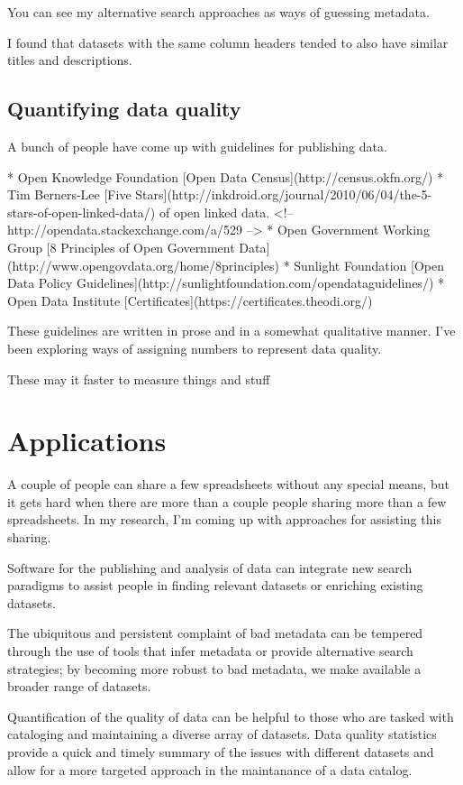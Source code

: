 \documentclass{acm_proc_article-sp}
\begin{document}
You can see my alternative search approaches as ways of guessing metadata.

I found that datasets with the same column headers
tended to also have similar titles and descriptions.


\subsection{Quantifying data quality}
A bunch of people have come up with guidelines for publishing data.

* Open Knowledge Foundation [Open Data Census](http://census.okfn.org/)
* Tim Berners-Lee [Five Stars](http://inkdroid.org/journal/2010/06/04/the-5-stars-of-open-linked-data/) of open linked data.
    <!-- http://opendata.stackexchange.com/a/529 -->
* Open Government Working Group [8 Principles of Open Government Data](http://www.opengovdata.org/home/8principles)
* Sunlight Foundation [Open Data Policy Guidelines](http://sunlightfoundation.com/opendataguidelines/)
* Open Data Institute [Certificates](https://certificates.theodi.org/)

These guidelines are written in prose and in a somewhat qualitative manner.
I've been exploring ways of assigning numbers to represent data quality.


These may it faster to measure things and stuff

\section{Applications}
A couple of people can share a few spreadsheets without any special means,
but it gets hard when there are more than a couple people sharing more than
a few spreadsheets. In my research, I'm coming up with approaches for assisting
this sharing.

Software for the publishing and analysis of data can integrate new search
paradigms to assist people in finding relevant datasets or enriching existing
datasets.

The ubiquitous and persistent complaint of bad metadata can be tempered through
the use of tools that infer metadata or provide alternative search strategies;
by becoming more robust to bad metadata, we make available a broader range of
datasets.

Quantification of the quality of data can be helpful to those who are tasked
with cataloging and maintaining a diverse array of datasets. Data quality
statistics provide a quick and timely summary of the issues with different
datasets and allow for a more targeted approach in the maintanance of a
data catalog.
\end{document}
